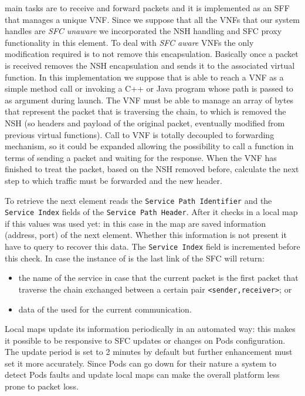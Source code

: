 \astaire{} main tasks are to receive and forward packets and it is implemented
as an SFF that manages a unique VNF. Since we suppose that all the VNFs that our
system handles are \emph{SFC unaware} we incorporated the NSH handling and SFC
proxy functionality in this element. To deal with \emph{SFC aware} VNFs the only
modification required is to not remove this encapsulation. Basically once a
packet is received \astaire{} removes the NSH encapsulation and sends it to the
associated
virtual function. In this implementation we suppose that \astaire{} is able to
reach a VNF as a
simple method call or invoking a C++ or Java program whose path is passed to 
\astaire{} as argument during launch. The VNF must be able to manage an array of
bytes that represent the packet that is traversing the chain, to which is
removed the NSH (so headers and payload of the original packet, eventually
modified from previous virtual functions). Call to VNF is totally decoupled
to forwarding mechanism, so it could be expanded allowing the possibility to
call a function in terms of sending a packet and waiting for the response. When
the VNF has finished to treat the packet, based on the NSH removed before,
calculate the next step to which traffic must be forwarded and the new header.

To retrieve the next element \astaire{} reads the \texttt{Service Path
Identifier} and the \texttt{Service Index} fields of the \texttt{Service Path
Header}. After it checks in a local map if this values was used yet: in this
case in the map are saved information (address, port) of the next element.
Whether this information is not present it have to query \roulette{} to recover
this data. The \texttt{Service Index} field is incremented before this check. In
case the instance of \astaire{} is the last link of the SFC \roulette{} will
return:
\begin{itemize}
  \item the name of the \egress{} service in case that the current packet is the
  first packet that traverse the chain exchanged between a certain pair
  \verb!<sender,receiver>!; or
  \item data of the \egress{} used for the current communication.
\end{itemize}
Local maps update its information periodically in an automated way: this makes
it
possible to be responsive to SFC updates or changes on Pods configuration. The
update period is set to 2 minutes by default but further enhancement must set it
more accurately. Since Pods can go down for their nature a system to detect
Pods faults and update local maps can make the overall platform less prone to
packet loss.

